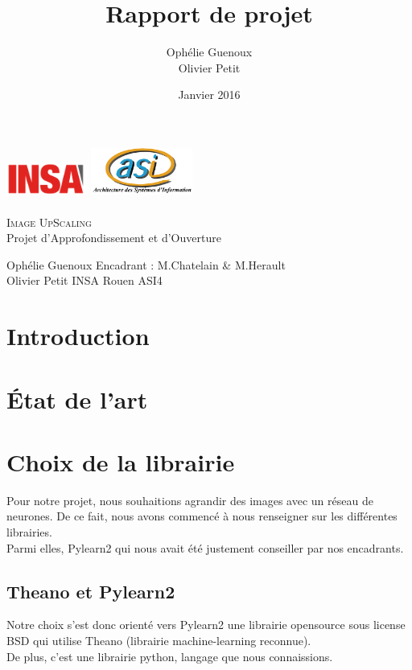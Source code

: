 \documentclass[12pt, a4paper]{article}
\title{Rapport de projet}
\author{Ophélie Guenoux \\Olivier Petit}
\date{Janvier 2016}
\begin{document}
\makeatletter
\begin{titlepage}
  \begin{center}
      \includegraphics[width=0.20\textwidth]{Images/Logo_INSA.png}
      \hfill
      \includegraphics[width=0.25\textwidth]{Images/logoasi.png}\\
    \vspace{1cm}
		\Huge \underline{\@title} 
			\\ \textsc{Image UpScaling}
			\\ \Large Projet d'Approfondissement et d'Ouverture
			\vspace{1cm}
			\begin{figure}[h!]
				\centering
			\end{figure}
	\vspace{1cm}
	\end{center}
	\raggedright
	\large Ophélie Guenoux \hfill Encadrant : M.Chatelain \& M.Herault
	\\Olivier Petit \hfill INSA Rouen ASI4
	
\end{titlepage}

\newpage
\tableofcontents
\newpage
\section*{Introduction}

\section{État de l'art}
\section{Choix de la librairie}
Pour notre projet, nous souhaitions agrandir des images avec un réseau de neurones. De ce fait, nous avons commencé à nous renseigner sur les différentes librairies. \\ Parmi elles, Pylearn2 qui nous avait été justement conseiller par nos encadrants. 
\subsection{Theano et Pylearn2}
Notre choix s'est donc orienté vers Pylearn2 une librairie opensource sous license BSD qui utilise Theano (librairie machine-learning reconnue).
\\ De plus, c'est une librairie python, langage que nous connaissions.
\\
\end{document}
